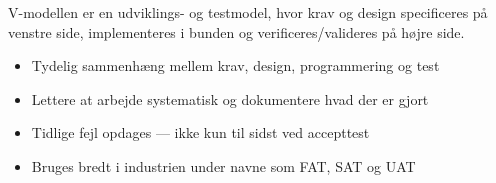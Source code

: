 \documentclass[12pt, a4paper]{article}
\begin{document}
V-modellen er en udviklings- og testmodel, hvor krav og design specificeres på venstre side, implementeres i bunden og verificeres/valideres på højre side.

\begin{tcolorbox}[tipbox, title={\faCheckCircle\quad Hvorfor bruge V-modellen?}]
\begin{itemize}[leftmargin=1.2em, itemsep=4pt]
  \item[\textcolor{successgreen}{\faArrowRight}]
    Tydelig sammenhæng mellem krav, design, programmering og test
  \item[\textcolor{successgreen}{\faArrowRight}]
    Lettere at arbejde systematisk og dokumentere hvad der er gjort
  \item[\textcolor{successgreen}{\faArrowRight}]
    Tidlige fejl opdages --- ikke kun til sidst ved accepttest
  \item[\textcolor{successgreen}{\faArrowRight}]
    Bruges bredt i industrien under navne som FAT, SAT og UAT
\end{itemize}
\end{tcolorbox}
\end{document}
